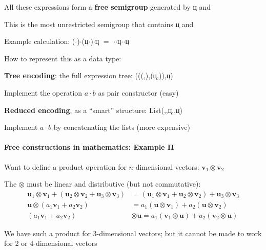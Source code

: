 All these expressions form a \textbf{free semigroup} generated by
\foreignlanguage{russian}{ц} and \shui

This is the most unrestricted semigroup that contains \foreignlanguage{russian}{ц}
and \shui

Example calculation: (\shui$\cdot$\shui)$\cdot$(\foreignlanguage{russian}{ц}$\cdot$\shui)$\cdot$\foreignlanguage{russian}{ц}
$=$ \shui$\cdot$\shui$\cdot$\foreignlanguage{russian}{ц}$\cdot$\shui$\cdot$\foreignlanguage{russian}{ц}

How to represent this as a data type:

\textbf{Tree encoding}: the full expression tree: (((\shui,\shui),(\foreignlanguage{russian}{ц},\shui)),\foreignlanguage{russian}{ц})

Implement the operation $a\cdot b$ as pair constructor (easy)

\textbf{Reduced encoding}, as a \textsf{``}smart\textsf{''} structure: List(\shui,\shui,\foreignlanguage{russian}{ц},\shui,\foreignlanguage{russian}{ц})

Implement $a\cdot b$ by concatenating the lists (more expensive)


\paragraph{Free constructions in mathematics: Example II}

Want to define a product operation for $n$-dimensional vectors: $\mathbf{v}_{1}\otimes\mathbf{v}_{2}$

The $\otimes$ must be linear and distributive (but not commutative):
\begin{align*}
\mathbf{u}_{1}\otimes\mathbf{v}_{1}+\left(\mathbf{u}_{2}\otimes\mathbf{v}_{2}+\mathbf{u}_{3}\otimes\mathbf{v}_{3}\right) & =\left(\mathbf{u}_{1}\otimes\mathbf{v}_{1}+\mathbf{u}_{2}\otimes\mathbf{v}_{2}\right)+\mathbf{u}_{3}\otimes\mathbf{v}_{3}\\
\mathbf{u}\otimes\left(a_{1}\mathbf{v}_{1}+a_{2}\mathbf{v}_{2}\right) & =a_{1}\left(\mathbf{u}\otimes\mathbf{v}_{1}\right)+a_{2}\left(\mathbf{u}\otimes\mathbf{v}_{2}\right)\\
\left(a_{1}\mathbf{v}_{1}+a_{2}\mathbf{v}_{2}\right) & \otimes\mathbf{u}=a_{1}\left(\mathbf{v}_{1}\otimes\mathbf{u}\right)+a_{2}\left(\mathbf{v}_{2}\otimes\mathbf{u}\right)
\end{align*}

We have such a product for 3-dimensional vectors; but it cannot be
made to work for 2 or 4-dimensional vectors

